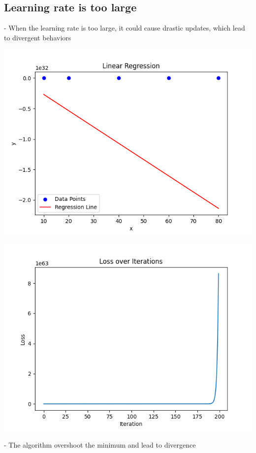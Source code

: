 \documentclass{article}
\begin{document}
\subsection{Learning rate is too large}
- When the learning rate is too large, it could cause drastic updates, which lead
to divergent behaviors
\begin{center}
    \includegraphics[width=0.5\linewidth]{5.png}

    \includegraphics[width=0.5\linewidth]{6.png}
\end{center}

- The algorithm overshoot the minimum and lead to divergence
\end{document}
